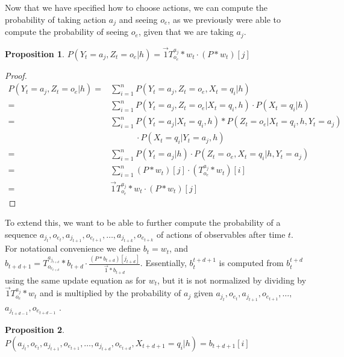 \documentclass{article}
\newtheorem{prop}{Proposition}
\theoremstyle{definition}
\def\probSeq#1#2{$a_{j_#1}$\-$,o_{e_#1},$\-$a_{j_{#1+1}},$\-$o_{e_{#1+1}},$\-$\ldots,$\-$a_{j_{#2}},$\-$o_{e_{#2}}$}
\begin{document}
Now that we have specified how to choose actions, we can compute the probability of taking action $a_j$ and seeing $o_e$, as we previously were able to compute the probability of seeing $o_e$, given that we are taking $a_j$.
\begin{prop}
$P(Y_t=a_j,Z_t=o_e|h)=\vec{1} T^{a_j}_{o_e}*w_t\cdot (P*w_t)[j]$
\end{prop}
\begin{proof}
\begin{align*}
P(Y_t=a_j,Z_t=o_e|h)=&\sum\limits_{i=1}^{n} P(Y_t=a_j,Z_t=o_e,X_t=q_i|h) \\
=&\sum\limits_{i=1}^{n} P(Y_t=a_j,Z_t=o_e|X_t=q_i,h)\cdot P(X_t=q_i|h) \\
=&\sum\limits_{i=1}^{n} P(Y_t=a_j|X_t=q_i,h)*P(Z_t=o_e|X_t=q_i,h,Y_t=a_j)\\
  & \phantom{\sum\limits_{i=1}^{n}}\cdot P(X_t=q_i|Y_t=a_j,h) \\
=&\sum\limits_{i=1}^{n} P(Y_t=a_j|h)\cdot P(Z_t=o_e,X_t=q_i|h,Y_t=a_j) \\
=&\sum\limits_{i=1}^{n} (P*w_t)[j]\cdot (T^{a_j}_{o_e}*w_t)[i] \\
=&\vec{1} T^{a_j}_{o_e}*w_t\cdot (P*w_t)[j]
\end{align*}
\end{proof}
To extend this,  we want to be able to further compute the probability of a sequence \probSeq{t}{t+k}
of actions of observables after time $t$.
For notational convenience we define $b_t=w_t$, and $b_{t+d+1}=T^{a_{j_{t+d}}}_{o_{e_{t+d}}}*b_{t+d}\cdot \frac{(P*b_{t+d})[j_{t+d}]}{\vec{1}*b_{t+d}}$. Essentially, $b_t^{t+d+1}$ is computed from $b_t^{t+d}$ using the same update equation as for $w_t$, but it is not normalized by dividing by $\vec{1}T^{a_j}_{o_e}*w_t$ and is multiplied by the probability of $a_j$ given \probSeq{t}{t+d-1}
.
\begin{prop} $P(a_{j_t},o_{e_t},a_{j_{t+1}},o_{e_{t+1}},\ldots,a_{j_{t+d}},o_{e_{t+d}},X_{t+d+1}=q_i|h)=b_{t+d+1}[i]$\end{prop}
\end{document}
